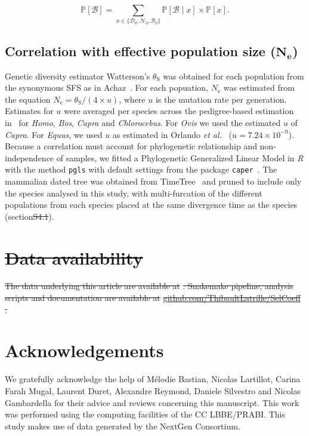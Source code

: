 \documentclass[10pt,letterpaper]{article}
\newcommand{\Ne}{N_{\text{e}}}
\newcommand{\proba}{\mathbb{P}}
\newcommand{\SphyDel}{\mathcal{D}_0}
\newcommand{\SphyNeu}{\mathcal{N}_0}
\newcommand{\SphyBen}{\mathcal{B}_0}
\newcommand{\Sphyclass}{x}
\newcommand{\given}{\mid}
\newcommand{\SpopBen}{\mathcal{B}}
\newcommand{\thetaSyn}{\theta_{\text{S}}}
\providecommand{\DIFaddtex}[1]{{\protect\color{blue}\uwave{#1}}} %
\providecommand{\DIFdeltex}[1]{{\protect\color{red}\sout{#1}}}                      %
\providecommand{\DIFaddbegin}{} %
\providecommand{\DIFaddend}{} %
\providecommand{\DIFdelbegin}{} %
\providecommand{\DIFdelend}{} %
\providecommand{\DIFadd}[1]{\texorpdfstring{\DIFaddtex{#1}}{#1}} %
\providecommand{\DIFdel}[1]{\texorpdfstring{\DIFdeltex{#1}}{}} %
\newcommand{\DIFscaledelfig}{0.5}
\newlength{\DIFdelgraphicswidth} %
\newlength{\DIFdelgraphicsheight} %
\newcommand{\DIFaddincludegraphics}[2][]{{\color{blue}\fbox{\DIFOincludegraphics[#1]{#2}}}} %
\newcommand{\DIFdelincludegraphics}[2][]{%
\sbox{\DIFdelgraphicsbox}{\DIFOincludegraphics[#1]{#2}}%
\settoboxwidth{\DIFdelgraphicswidth}{\DIFdelgraphicsbox} %
\settoboxtotalheight{\DIFdelgraphicsheight}{\DIFdelgraphicsbox} %
\scalebox{\DIFscaledelfig}{%
\parbox[b]{\DIFdelgraphicswidth}{\usebox{\DIFdelgraphicsbox}\\[-\baselineskip] \rule{\DIFdelgraphicswidth}{0em}}\llap{\resizebox{\DIFdelgraphicswidth}{\DIFdelgraphicsheight}{%
\setlength{\unitlength}{\DIFdelgraphicswidth}%
\begin{picture}(1,1)%
\thicklines\linethickness{2pt} %
{\color[rgb]{1,0,0}\put(0,0){\framebox(1,1){}}}%
{\color[rgb]{1,0,0}\put(0,0){\line( 1,1){1}}}%
{\color[rgb]{1,0,0}\put(0,1){\line(1,-1){1}}}%
\end{picture}%
}\hspace*{3pt}}} %
} %
\DeclareRobustCommand{\DIFaddbegin}{\DIFOaddbegin \let\includegraphics\DIFaddincludegraphics} %
\DeclareRobustCommand{\DIFaddend}{\DIFOaddend \let\includegraphics\DIFOincludegraphics} %
\DeclareRobustCommand{\DIFdelbegin}{\DIFOdelbegin \let\includegraphics\DIFdelincludegraphics} %
\DeclareRobustCommand{\DIFdelend}{\DIFOaddend \let\includegraphics\DIFOincludegraphics} %
\begin{document}
\begin{equation}
\proba [ \SpopBen ] = \sum_{\Sphyclass \in \{\SphyDel, \SphyNeu, \SphyBen \} }\proba [\SpopBen \given \Sphyclass ] \times \proba [\Sphyclass ].
\label{eq:total_proba}
\end{equation}

\subsection{Correlation with effective population size (\texorpdfstring{$\bm{\Ne}$}{Nₑ})}
\label{subsec:correlation-diversity}
Genetic diversity estimator Watterson's $\thetaSyn$ was obtained for each population from the synonymous SFS as in Achaz~\cite{achaz_frequency_2009}.
For each popuation, $\Ne$ was estimated from the equation $\Ne=\thetaSyn / (4 \times u)$, where $u$ is the mutation rate per generation.
Estimates for $u$ were averaged per species across the pedigree-based estimation in~\cite{bergeron_evolution_2023} for \textit{Homo}, \textit{Bos}, \textit{Capra} and \textit{Chlorocebus}.
For \textit{Ovis} we used the estimated $u$ of \textit{Capra}.
For \textit{Equus}, we used $u$ as estimated in Orlando \textit{et al.}~\cite{orlando_recalibrating_2013} ($u=7.24\times10^{-9}$).
Because a correlation must account for phylogenetic relationship and non-independence of samples, we fitted a Phylogenetic Generalized Linear Model in \textit{R} with the method \texttt{pgls} with default settings from the package \texttt{caper}~\cite{orme_caper_2013}.
The mammalian dated tree was obtained from TimeTree~\cite{kumar_timetree_2017} and pruned to include only the species analysed in this study, with multi-furcation of the different populations from each species placed at the same divergence time as the species (section\DIFdelbegin \DIFdel{S4.1}\DIFdelend \DIFaddbegin \DIFadd{~2.1 in~}\DIFaddend ).

\DIFdelbegin \section*{\DIFdel{Data availability}}
\DIFdel{The data underlying this article are available at }%
\DIFdel{.
Snakemake pipeline, analysis scripts and documentation are available at }\href{https://github.com/ThibaultLatrille/SelCoeff}{\DIFdel{github.com/ThibaultLatrille/SelCoeff}}%
\DIFdel{.
}%

\DIFdelend \section*{Acknowledgements}
\label{sec:acknowledgment}
We gratefully acknowledge the help of Mélodie Bastian, Nicolas Lartillot, Carina Farah Mugal, Laurent Duret, Alexandre Reymond, Daniele Silvestro and Nicolas Gambardella for their advice and reviews concerning this manuscript.
This work was performed using the computing facilities of the CC LBBE/PRABI\@.
This study makes use of data generated by the NextGen Consortium.
\end{document}
